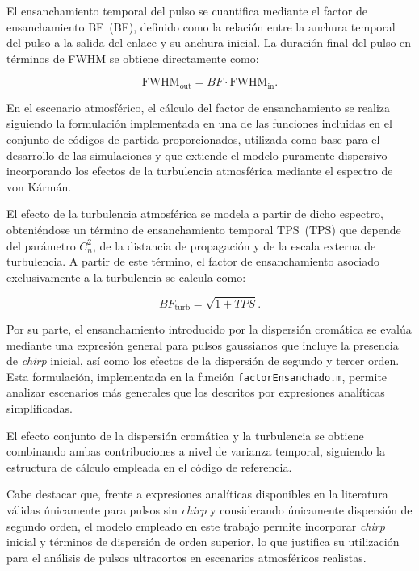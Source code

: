 El ensanchamiento temporal del pulso se cuantifica mediante el factor de ensanchamiento \acs{BF}~(\acl{BF}), definido como la relación entre la anchura temporal del pulso a la salida del enlace y su anchura inicial. La duración final del pulso en términos de FWHM se obtiene directamente como:

\begin{equation}
\mathrm{FWHM}_{\mathrm{out}} = BF \cdot \mathrm{FWHM}_{\mathrm{in}}.
\end{equation}

En el escenario atmosférico, el cálculo del factor de ensanchamiento se realiza siguiendo la formulación implementada en una de las funciones incluidas en el conjunto de códigos de partida proporcionados, utilizada como base para el desarrollo de las simulaciones y que extiende el modelo puramente dispersivo incorporando los efectos de la turbulencia atmosférica mediante el espectro de von Kármán.

El efecto de la turbulencia atmosférica se modela a partir de dicho espectro, obteniéndose un término de ensanchamiento temporal \acs{TPS}~(\acl{TPS}) que depende del parámetro $C_n^2$, de la distancia de propagación y de la escala externa de turbulencia. A partir de este término, el factor de ensanchamiento asociado exclusivamente a la turbulencia se calcula como: 

\begin{equation}
BF_{\mathrm{turb}} = \sqrt{1 + TPS}.
\end{equation}

Por su parte, el ensanchamiento introducido por la dispersión cromática se evalúa mediante una expresión general para pulsos gaussianos que incluye la presencia de \textit{chirp} inicial, así como los efectos de la dispersión de segundo y tercer orden. Esta formulación, implementada en la función \texttt{factorEnsanchado.m}, permite analizar escenarios más generales que los descritos por expresiones analíticas simplificadas.


El efecto conjunto de la dispersión cromática y la turbulencia se obtiene combinando ambas contribuciones a nivel de varianza temporal, siguiendo la estructura de cálculo empleada en el código de referencia.

Cabe destacar que, frente a expresiones analíticas disponibles en la literatura válidas únicamente para pulsos sin \textit{chirp} y considerando únicamente dispersión de segundo orden, el modelo empleado en este trabajo permite incorporar \textit{chirp} inicial y términos de dispersión de orden superior, lo que justifica su utilización para el análisis de pulsos ultracortos en escenarios atmosféricos realistas.

